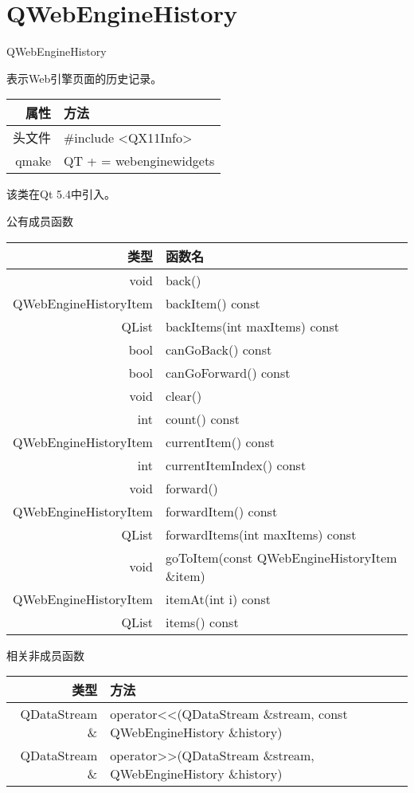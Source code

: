 \chapter{QWebEngineHistory}

QWebEngineHistory 

表示Web引擎页面的历史记录。

\begin{tabular}{|r|l|}
	\hline
	属性 & 方法 \\
	\hline
	头文件 & \#include <QX11Info>\\      
	\hline
	qmake & QT + = webenginewidgets \\      
	\hline
\end{tabular}

该类在Qt 5.4中引入。

公有成员函数


\begin{tabular}{|r|l|}
	\hline
	类型 & 函数名 \\
	\hline
	void	& back()\\
	\hline
	QWebEngineHistoryItem	& backItem() const \\
	\hline
	QList&	backItems(int maxItems) const \\
	\hline
	bool	&canGoBack() const \\
	\hline
	bool & canGoForward() const \\ 
	\hline
	void &	clear()\\ 
	\hline
	int &	count() const \\
	\hline
	QWebEngineHistoryItem &currentItem()
	 const \\
	\hline
	int &	currentItemIndex() const \\ 
	\hline
	void &	forward() \\ 
	\hline
	QWebEngineHistoryItem &	forwardItem() const \\ 
	\hline
	QList &	forwardItems(int maxItems) const \\
	\hline
	void &	goToItem(const
    QWebEngineHistoryItem \&item)\\
	\hline
	QWebEngineHistoryItem &	itemAt(int i) const \\ 
	\hline
	QList &	items() const \\ 
	\hline
\end{tabular}

相关非成员函数

\begin{tabular}{|r|l|}
	\hline
	类型 & 方法 \\
	\hline
	QDataStream \&	& operator<<(QDataStream \&stream, const QWebEngineHistory \&history)\\
	\hline
	QDataStream \&	&operator>>(QDataStream \&stream, QWebEngineHistory \&history) \\
	\hline
\end{tabular}

